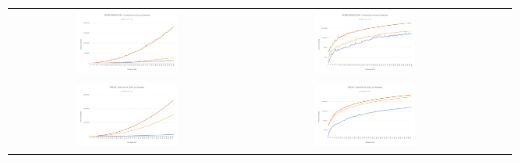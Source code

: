 \begin{center}
\begin{tabular}{cccc}
	  \includegraphics[width=0.45\textwidth]{imagenes/testperformance/MONOperformanceLIN.png} &
	  \includegraphics[width=0.45\textwidth]{imagenes/testperformance/MONOperformanceLOG.png} \\
	  \includegraphics[width=0.45\textwidth]{imagenes/testperformance/ONDASperformanceLIN.png} &
	  \includegraphics[width=0.45\textwidth]{imagenes/testperformance/ONDASperformanceLOG.png} \\
	\end{tabular}
\end{center}


